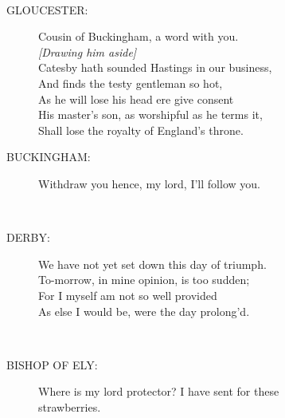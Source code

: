 \documentclass{article}
\begin{document}
\centering{\it [Exit]}\\
\begin{description}
\item[GLOUCESTER:] 
\hspace{1pt}Cousin of Buckingham, a word with you.\\
{\it [Drawing him aside]}\\
\hspace{1pt}Catesby hath sounded Hastings in our business,\\
\hspace{1pt}And finds the testy gentleman so hot,\\
\hspace{1pt}As he will lose his head ere give consent\\
\hspace{1pt}His master's son, as worshipful as he terms it,\\
\hspace{1pt}Shall lose the royalty of England's throne.\\
\end{description}
\begin{description}
\item[BUCKINGHAM:] 
\hspace{1pt}Withdraw you hence, my lord, I'll follow you.\\
\end{description}
\\
\begin{description}
\item[DERBY:] 
\hspace{1pt}We have not yet set down this day of triumph.\\
\hspace{1pt}To-morrow, in mine opinion, is too sudden;\\
\hspace{1pt}For I myself am not so well provided\\
\hspace{1pt}As else I would be, were the day prolong'd.\\
\end{description}
\\
\begin{description}
\item[BISHOP OF ELY:] 
\hspace{1pt}Where is my lord protector? I have sent for these\\
\hspace{1pt}strawberries.\\
\end{description}
\end{document}
